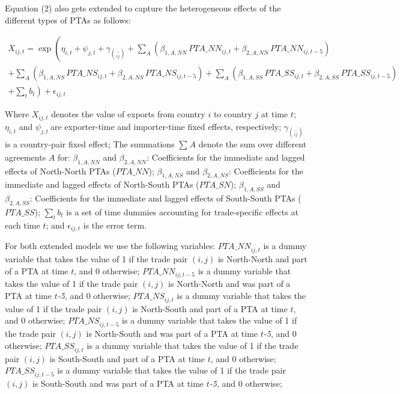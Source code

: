 \documentclass[12pt]{article}%
\begin{document}
Equation (2) also gets extended to capture the heterogeneous effects of
the different types of PTAs as follows:

\begin{multline}
    X_{ij,t} = \exp\left(\eta_{i,t} + \psi_{j,t} + \gamma_{\binom{-}{ij}} + \sum_{A}\left(\beta_{1,A,NN} \, PTA\_NN_{ij,t} + \beta_{2,A,NN} \, PTA\_NN_{ij,t-5}\right) \right. \\
    + \sum_{A}\left(\beta_{1,A,NS} \, PTA\_NS_{ij,t} + \beta_{2,A,NS} \, PTA\_NS_{ij,t-5}\right) + \sum_{A}\left(\beta_{1,A,SS} \, PTA\_SS_{ij,t} + \beta_{2,A,SS} \, PTA\_SS_{ij,t-5}\right) \\
    + \left. \sum_{t} b_{t} \right) + \epsilon_{ij,t}
\end{multline}

Where \(X_{ij,t}\)\hspace{0pt} denotes the value of exports from country
\(i\) to country \(j\) at time \(t\); \(\eta_{i,t}\) and
\(\psi_{j,t}\ \)are exporter-time and importer-time fixed effects,
respectively; \(\gamma_{\binom{-}{ij}}\) is a country-pair fixed effect;
The summations \hspace{0pt}\(\sum_{}^{}A\) denote the sum over different
agreements \(A\) for: \(\beta_{1,A,NN}\) and \(\beta_{2,A,NN}\):
Coefficients for the immediate and lagged effects of North-North PTAs
\hspace{0pt}(\(PTA\_ NN\)); \(\beta_{1,A,NS}\) and \(\beta_{2,A,NS}\):
Coefficients for the immediate and lagged effects of North-South PTAs
(\(PTA\_ SN\)); \(\beta_{1,A,SS}\) and \(\beta_{2,A,SS}\): Coefficients
for the immediate and lagged effects of South-South PTAs (\(PTA\_ SS\));
\(\sum_{t}^{}b_{t}\) is a set of time dummies accounting for
trade-specific effects at each time \(t\); and \(\epsilon_{ij,t}\) is
the error term.

For both extended models we use the following variables:
\({PTA\_ NN}_{ij,t}\) is a dummy variable that takes the value of 1 if
the trade pair \((i,j)\) is North-North and part of a PTA at time \(t\),
and 0 otherwise; \({PTA\_ NN}_{ij,t - 5}\) is a dummy variable that
takes the value of 1 if the trade pair \((i,j)\) is North-North and was
part of a PTA at time \(t\)\emph{-5}, and 0 otherwise;
\({PTA\_ NS}_{ij,t}\) is a dummy variable that takes the value of 1 if
the trade pair \((i,j)\) is North-South and part of a PTA at time \(t\),
and 0 otherwise; \({PTA\_ NS}_{ij,t - 5}\) is a dummy variable that
takes the value of 1 if the trade pair \((i,j)\) is North-South and was
part of a PTA at time \(t\)\emph{-5}, and 0 otherwise;
\({PTA\_ SS}_{ij,t}\) is a dummy variable that takes the value of 1 if
the trade pair \((i,j)\) is South-South and part of a PTA at time \(t\),
and 0 otherwise; \({PTA\_ SS}_{ij,t - 5}\) is a dummy variable that
takes the value of 1 if the trade pair \((i,j)\) is South-South and was
part of a PTA at time \(t\)\emph{-5}, and 0 otherwise;
\end{document}
